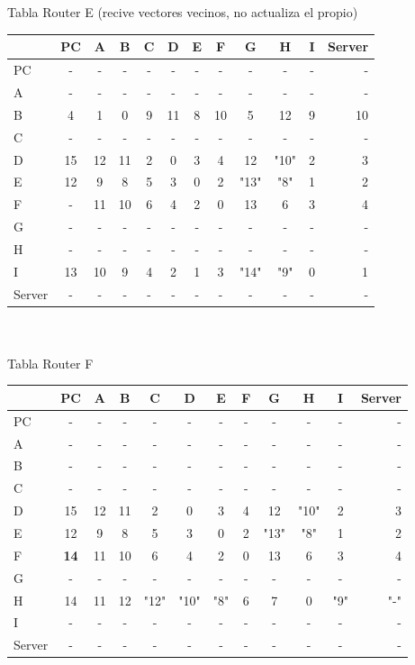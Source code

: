 \documentclass{article}
\begin{document}
\\
\\
Tabla Router E (recive vectores vecinos, no actualiza el propio) \\
\begin{tabular}{l*{10}{c}r}
              & PC & A & B & C & D & E & F & G & H & I & Server \\
\hline
PC             & - & - & - & - & - & - & - & - & - & - & -\\
A              & - & - & - & - & - & - & - & - & - & - & -\\
B              & 4 & 1 & 0 & 9 & 11	& 8 & 10 & 5 & 12 & 9 & 10\\
C              & - & - & - & - & - & - & - & - & - & - & -\\
D              & 15 & 12 & 11 & 2 & 0 & 3 & 4 & 12 & "10" & 2 & 3\\
E              & 12 & 9 & 8 & 5 & 3 & 0 & 2 & "13" & "8" & 1 & 2\\
F              & - & 11 & 10 & 6 & 4 & 2 & 0 & 13 & 6 & 3 & 4\\
G              & - & - & - & - & - & - & - & - & - & - & -\\
H              & - & - & - & - & - & - & - & - & - & - & -\\
I              & 13 & 10 & 9 & 4 & 2 & 1 & 3 & "14" & "9" & 0 & 1\\
Server         & - & - & - & - & - & - & - & - & - & - & -\\

\end{tabular}
\\
\\
Tabla Router F \\
\begin{tabular}{l*{10}{c}r}
              & PC & A & B & C & D & E & F & G & H & I & Server \\
\hline
PC             & - & - & - & - & - & - & - & - & - & - & -\\
A              & - & - & - & - & - & - & - & - & - & - & -\\
B              & - & - & - & - & - & - & - & - & - & - & -\\
C              & - & - & - & - & - & - & - & - & - & - & -\\
D              & 15 & 12 & 11 & 2 & 0 & 3 & 4 & 12 & "10" & 2 & 3\\
E              & 12 & 9 & 8 & 5 & 3 & 0 & 2 & "13" & "8" & 1 & 2\\
F              &\bf{14}& 11 & 10 & 6 & 4 & 2 & 0 & 13 & 6 & 3 & 4\\
G              & - & - & - & - & - & - & - & - & - & - & -\\
H              & 14 & 11 & 12 & "12" & "10" & "8" & 6 & 7 & 0 & "9" & "-"\\
I              & - & - & - & - & - & - & - & - & - & - & -\\
Server         & - & - & - & - & - & - & - & - & - & - & -\\

\end{tabular}
\end{document}
